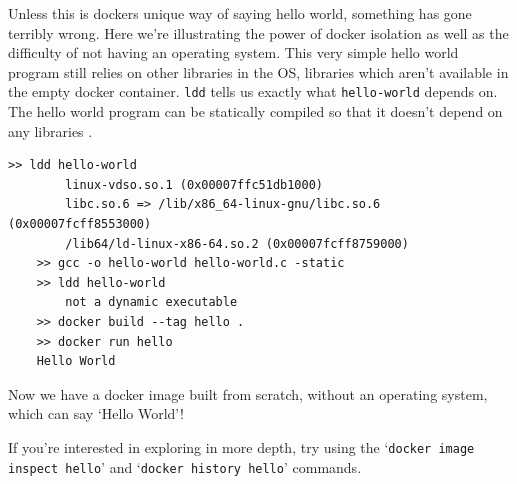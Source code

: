 \documentclass{csse4400}
\begin{document}
Unless this is dockers unique way of saying hello world, something has gone terribly wrong.
Here we're illustrating the power of docker isolation as well as the difficulty of not having an operating system.
This very simple hello world program still relies on other libraries in the OS, libraries which aren't available in the empty docker container.
\texttt{ldd} tells us exactly what \texttt{hello-world} depends on.
The hello world program can be statically compiled so that it doesn't depend on any libraries \cite{static-hello-world}.

\begin{shaded*}
\begin{lstlisting}[language=shell]
    >> ldd hello-world
        linux-vdso.so.1 (0x00007ffc51db1000)
        libc.so.6 => /lib/x86_64-linux-gnu/libc.so.6 (0x00007fcff8553000)
        /lib64/ld-linux-x86-64.so.2 (0x00007fcff8759000)
    >> gcc -o hello-world hello-world.c -static
    >> ldd hello-world
        not a dynamic executable
    >> docker build --tag hello .
    >> docker run hello
    Hello World
\end{lstlisting}
\end{shaded*}

Now we have a docker image built from scratch, without an operating system, which can say `Hello World'!
\begin{extra}
If you're interested in exploring in more depth, try using the `\texttt{docker image inspect hello}'
and `\texttt{docker history hello}' commands.
\end{extra}




\end{document}
